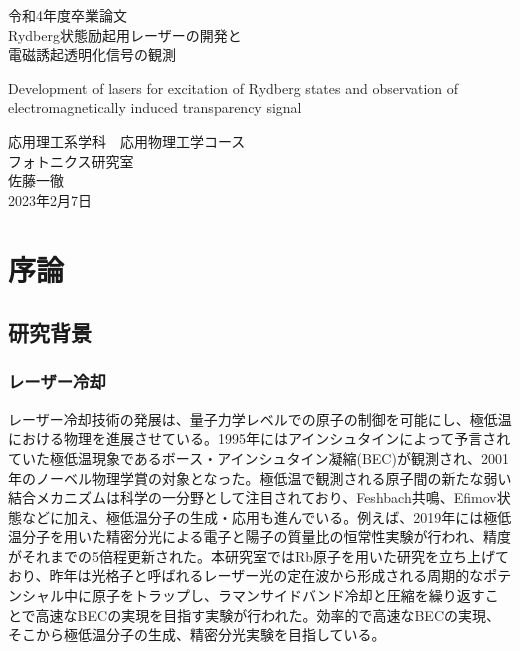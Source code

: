\documentclass[dvipdfmx]{jsreport}
\begin{document}
\begin{titlepage}
   \begin{center}
       \vspace*{3cm}

       \huge
       令和4年度卒業論文\\
       \vspace{0.5cm}
       Rydberg状態励起用レーザーの開発と\\電磁誘起透明化信号の観測
       
       \vspace{0.5cm}
       \LARGE
        Development of lasers for excitation of Rydberg states and observation of electromagnetically induced transparency signal

       \large
       \vspace{2cm}
       応用理工系学科　応用物理工学コース \\
       
       \vspace{1cm}
       フォトニクス研究室 \\
       
    \vspace{1cm}
       佐藤一徹 \\
            
       \vspace{1cm}
       2023年2月7日            
   \end{center}
\end{titlepage}

\setcounter{tocdepth}{3}
\tableofcontents

\clearpage
\chapter{序論}
\section{研究背景}
\subsection{レーザー冷却}
レーザー冷却技術の発展は、量子力学レベルでの原子の制御を可能にし、極低温における物理を進展させている。1995年にはアインシュタインによって予言されていた極低温現象であるボース・アインシュタイン凝縮(BEC)が観測され、2001年のノーベル物理学賞の対象となった。\cite{bose}極低温で観測される原子間の新たな弱い結合メカニズムは科学の一分野として注目されており、Feshbach共鳴\cite{fesh}、Efimov状態\cite{efimov}などに加え、極低温分子の生成・応用も進んでいる。例えば、2019年には極低温分子を用いた精密分光による電子と陽子の質量比の恒常性実験が行われ、精度がそれまでの5倍程更新された。\cite{kobayashi}本研究室ではRb原子を用いた研究を立ち上げており、昨年は光格子と呼ばれるレーザー光の定在波から形成される周期的なポテンシャル中に原子をトラップし、ラマンサイドバンド冷却と圧縮を繰り返すことで高速なBECの実現を目指す実験が行われた。\cite{okuda}効率的で高速なBECの実現、そこから極低温分子の生成、精密分光実験を目指している。
\end{document}
